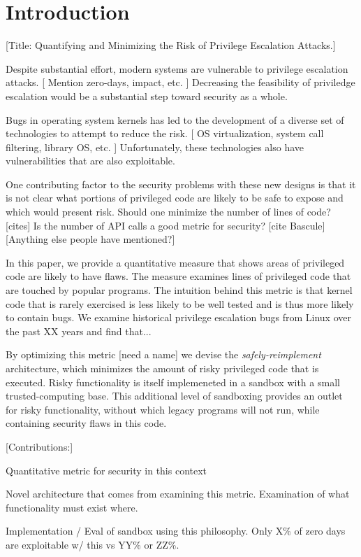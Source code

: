 \section{Introduction}
\label{sec.introduction}

[Title: Quantifying and Minimizing the Risk of Privilege Escalation Attacks.]

Despite substantial effort, modern systems are vulnerable to privilege 
escalation attacks.  [ Mention zero-days, impact, etc. ]
Decreasing the feasibility of priviledge escalation would be a substantial
step toward security as a whole.


Bugs in operating system kernels has led to the development of a diverse set of
technologies to attempt to reduce the risk.  [ OS virtualization, system
call filtering, library OS, etc. ]  Unfortunately, these technologies also 
have vulnerabilities that are also exploitable.

One contributing factor to the security problems with these new designs is
that it is not clear what portions of privileged code are
likely to be safe to expose and which would present risk.
Should one minimize the number of lines of code? [cites]  Is the number of API 
calls a good metric for security? [cite Bascule]  [Anything else people have
mentioned?]  

In this paper, we provide a quantitative measure that shows
areas of privileged code are likely to have flaws.  
The measure examines lines of privileged code that are touched by popular 
programs.  The intuition behind this metric is that kernel code that is rarely
exercised is less likely to be well tested and is thus more likely to contain
bugs.  We examine historical privilege escalation bugs from Linux over
the past XX years and find that...

By optimizing this metric [need a name] we devise the \emph{safely-reimplement}
architecture, which minimizes the amount of risky privileged code that is
executed.  
Risky functionality is itself implemeneted in a sandbox with
a small trusted-computing base.  This additional level of sandboxing 
provides an outlet for risky functionality, without which legacy programs
will not run, while containing security flaws in this code.  

[Contributions:]

Quantitative metric for security in this context

Novel architecture that comes from examining this metric.  Examination of
what functionality must exist where.

Implementation / Eval of sandbox using this philosophy.  Only X\% of zero
days are exploitable w/ this vs YY\% or ZZ\%.



